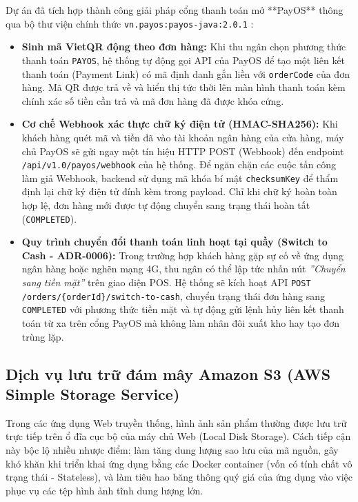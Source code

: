 Dự án đã tích hợp thành công giải pháp cổng thanh toán mở **PayOS** thông qua bộ thư viện chính thức \texttt{vn.payos:payos-java:2.0.1} \cite{payosdoc2024}:
\begin{itemize}[leftmargin=1.5cm]
    \item \textbf{Sinh mã VietQR động theo đơn hàng:} Khi thu ngân chọn phương thức thanh toán \texttt{PAYOS}, hệ thống tự động gọi API của PayOS để tạo một liên kết thanh toán (Payment Link) có mã định danh gắn liền với \texttt{orderCode} của đơn hàng. Mã QR được trả về và hiển thị tức thời lên màn hình thanh toán kèm chính xác số tiền cần trả và mã đơn hàng đã được khóa cứng.
    \item \textbf{Cơ chế Webhook xác thực chữ ký điện tử (HMAC-SHA256):} Khi khách hàng quét mã và tiền đã vào tài khoản ngân hàng của cửa hàng, máy chủ PayOS sẽ gửi ngay một tín hiệu HTTP POST (Webhook) đến endpoint \texttt{/api/v1.0/payos/webhook} của hệ thống. Để ngăn chặn các cuộc tấn công làm giả Webhook, backend sử dụng mã khóa bí mật \texttt{checksumKey} để thẩm định lại chữ ký điện tử đính kèm trong payload. Chỉ khi chữ ký hoàn toàn hợp lệ, đơn hàng mới được tự động chuyển sang trạng thái hoàn tất (\texttt{COMPLETED}).
    \item \textbf{Quy trình chuyển đổi thanh toán linh hoạt tại quầy (Switch to Cash - ADR-0006):} Trong trường hợp khách hàng gặp sự cố về ứng dụng ngân hàng hoặc nghẽn mạng 4G, thu ngân có thể lập tức nhấn nút \textit{''Chuyển sang tiền mặt''} trên giao diện POS. Hệ thống sẽ kích hoạt API \texttt{POST /orders/\{orderId\}/switch-to-cash}, chuyển trạng thái đơn hàng sang \texttt{COMPLETED} với phương thức tiền mặt và tự động gửi lệnh hủy liên kết thanh toán từ xa trên cổng PayOS mà không làm nhân đôi xuất kho hay tạo đơn trùng lặp.
\end{itemize}

\subsection{Dịch vụ lưu trữ đám mây Amazon S3 (AWS Simple Storage Service)}
Trong các ứng dụng Web truyền thống, hình ảnh sản phẩm thường được lưu trữ trực tiếp trên ổ đĩa cục bộ của máy chủ Web (Local Disk Storage). Cách tiếp cận này bộc lộ nhiều nhược điểm: làm tăng dung lượng sao lưu của mã nguồn, gây khó khăn khi triển khai ứng dụng bằng các Docker container (vốn có tính chất vô trạng thái - Stateless), và làm tiêu hao băng thông quý giá của ứng dụng vào việc phục vụ các tệp hình ảnh tĩnh dung lượng lớn.


